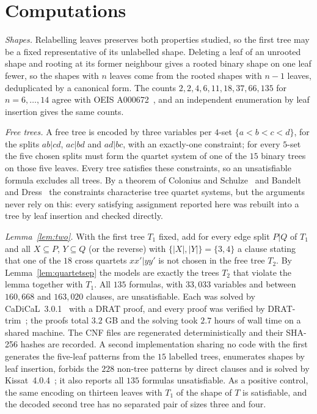 \documentclass[11pt]{amsart}
\theoremstyle{remark}
\begin{document}
\section{Computations}\label{sec:sat}

\emph{Shapes.} Relabelling leaves preserves both properties studied, so the first tree may be a fixed representative of its unlabelled shape. Deleting a leaf of an unrooted shape and rooting at its former neighbour gives a rooted binary shape on one leaf fewer, so the shapes with $n$ leaves come from the rooted shapes with $n-1$ leaves, deduplicated by a canonical form. The counts $2,2,4,6,11,18,37,66,135$ for $n=6,\dots,14$ agree with OEIS A000672~\cite{OEISA000672}, and an independent enumeration by leaf insertion gives the same counts.

\emph{Free trees.} A free tree is encoded by three variables per $4$-set $\{a<b<c<d\}$, for the splits $ab|cd$, $ac|bd$ and $ad|bc$, with an exactly-one constraint; for every $5$-set the five chosen splits must form the quartet system of one of the $15$ binary trees on those five leaves. Every tree satisfies these constraints, so an unsatisfiable formula excludes all trees. By a theorem of Colonius and Schulze~\cite{CS1981} and Bandelt and Dress~\cite{BD1986} the constraints characterise tree quartet systems, but the arguments never rely on this: every satisfying assignment reported here was rebuilt into a tree by leaf insertion and checked directly.

\emph{Lemma~\ref{lem:two}.} With the first tree $T_1$ fixed, add for every edge split $P|Q$ of $T_1$ and all $X\subseteq P$, $Y\subseteq Q$ (or the reverse) with $\{|X|,|Y|\}=\{3,4\}$ a clause stating that one of the $18$ cross quartets $xx'|yy'$ is not chosen in the free tree $T_2$. By Lemma~\ref{lem:quartetsep} the models are exactly the trees $T_2$ that violate the lemma together with $T_1$. All $135$ formulas, with $33{,}033$ variables and between $160{,}668$ and $163{,}020$ clauses, are unsatisfiable. Each was solved by CaDiCaL~3.0.1~\cite{CaDiCaL2} with a DRAT proof, and every proof was verified by DRAT-trim~\cite{DRATtrim}; the proofs total $3.2$ GB and the solving took $2.7$ hours of wall time on a shared machine. The CNF files are regenerated deterministically and their SHA-256 hashes are recorded. A second implementation sharing no code with the first generates the five-leaf patterns from the $15$ labelled trees, enumerates shapes by leaf insertion, forbids the $228$ non-tree patterns by direct clauses and is solved by Kissat~4.0.4~\cite{Kissat}; it also reports all $135$ formulas unsatisfiable. As a positive control, the same encoding on thirteen leaves with $T_1$ of the shape of $T$ is satisfiable, and the decoded second tree has no separated pair of sizes three and four.
\end{document}
